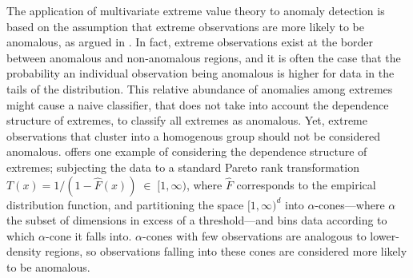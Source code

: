 The application of multivariate extreme value theory to anomaly detection is 
    based on the  assumption that extreme observations are more likely to be 
    anomalous, as argued in \cite{goix2017}. In fact, extreme observations 
    exist at the border between anomalous and non-anomalous regions, and it is 
    often the case that the probability an individual observation being 
    anomalous is higher for data in the tails of the distribution.
    This relative abundance of anomalies among extremes might cause a naive 
    classifier, that does not take into account the dependence structure of 
    extremes, to classify all extremes as anomalous. Yet, extreme observations 
    that cluster into a homogenous group should not be considered anomalous.
    \cite{goix2017} offers one example of considering the dependence structure 
    of extremes; subjecting the data to a standard Pareto rank transformation 
    $T(x) = 1/(1 - \hat{F}(x))\;\in\;[1,\infty)$, where $\hat{F}$ corresponds 
    to the empirical distribution function, 
    and partitioning the space $[1,\infty)^d$ into $\alpha$-cones---where 
    $\alpha$ the subset of dimensions in excess of a threshold---and bins 
    data according to which $\alpha$-cone it falls into.  $\alpha$-cones with 
    few observations are analogous to lower-density regions, so observations 
    falling into these cones are considered more likely to be anomalous.

